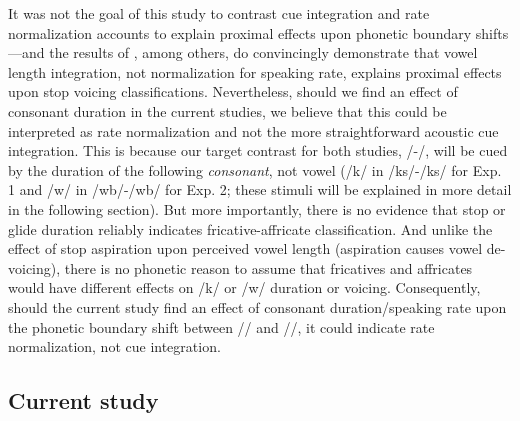 \documentclass[preprint]{JASA}
\begin{document}
It was not the goal of this study to contrast cue integration and rate normalization accounts to explain proximal effects upon phonetic boundary shifts---and the results of \citet{toscanoCueintegrationContextEffects2012}, among others, do convincingly demonstrate that vowel length integration, not normalization for speaking rate, explains proximal effects upon stop voicing classifications. Nevertheless, should we find an effect of consonant duration in the current studies, we believe that this could be interpreted as rate normalization and not the more straightforward acoustic cue integration. This is because our target contrast for both studies, /\textesh-\textteshlig/, will be cued by the duration of the following \textit{consonant}, not vowel (/k/ in /\textesh k\textscripta s/-/\textteshlig k\textscripta s/ for Exp. 1 and /w/ in /\textesh w\textsci b/-/\textteshlig w\textsci b/ for Exp. 2; these stimuli will be explained in more detail in the following section). But more importantly, there is no evidence that stop or glide duration reliably indicates fricative-affricate classification. And unlike the effect of stop aspiration upon perceived vowel length (aspiration causes vowel de-voicing), there is no phonetic reason to assume that fricatives and affricates would have different effects on /k/ or /w/ duration or voicing. Consequently, should the current study find an effect of consonant duration/speaking rate upon the phonetic boundary shift between /\textesh/ and /\textteshlig/, it could indicate rate normalization, not cue integration. 

\subsection{Current study}
\end{document}
